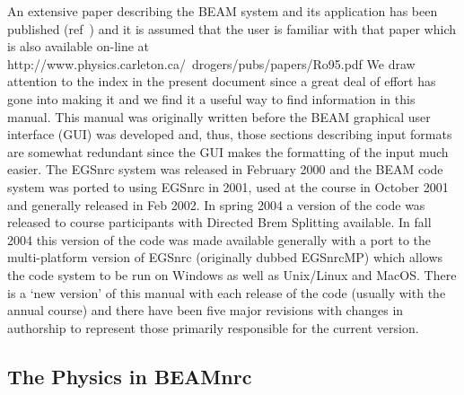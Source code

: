\documentclass[12pt,twoside]{article}
\begin{document}
An extensive paper describing the BEAM system and its application has
been published (ref~\cite{Ro95}) and it is assumed that the user is
familiar with that paper which is also available on-line at
{http://www.physics.carleton.ca/~drogers/pubs/papers/Ro95.pdf}
We draw attention to the index in the present document
since a great deal of effort has gone
into making it and we find it a useful way to find information in this
manual.  This manual was originally written before the BEAM graphical
user interface (GUI) was developed\cite{Tr04} and, thus, those sections
describing input formats are somewhat redundant since the GUI makes the
formatting of the input much easier. The EGSnrc
system\cite{Ka99a,KR03,Ro00} was released in February 2000 and the BEAM
code system was ported to using EGSnrc in 2001, used at the course in
October 2001 and generally released in Feb 2002. In spring 2004 a version
of the code was released to course participants with Directed Brem
Splitting available. In fall 2004 this version of the code was made
available generally with a port to the multi-platform version of EGSnrc
(originally dubbed EGSnrcMP) which allows the code system to be run on Windows
as well as Unix/Linux and MacOS. There is a `new version'
of this manual with each release of the code (usually with the annual
course) and there have been five major
revisions\cite{Ro95b,Ro97,Ro98a,Ro01b,Ro04} with changes in authorship to
represent those primarily responsible for the current version.
 

\subsection{The Physics in BEAMnrc}
\end{document}
